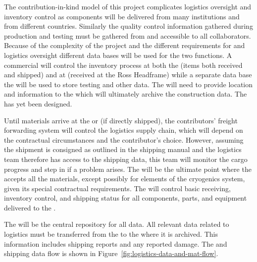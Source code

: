 The contribution-in-kind model of this project complicates logistics oversight and inventory control as components will be delivered from many institutions and from different countries. 
Similarly the quality control information gathered during production and testing must be gathered from and accessible to all collaborators. 
Because of the complexity of the project and the different requirements for  and logistics oversight different data bases will be used for the two functions. A commercial  will control the inventory process at both the  (items both received and shipped) and at  (received at the Ross Headframe) while a separate data base the  will be used to store testing and other  data. The  will need to provide location and   information to the  which will ultimately archive the construction data. The  has yet been designed.

Until materials arrive at the  or  (if directly shipped), the contributors' freight forwarding system will control the logistics supply chain, which will depend on the contractual circumstances and the contributor's choice. 
However, assuming the shipment is consigned as outlined in the 
shipping manual and the  logistics team therefore has access to the shipping data, this team will monitor the cargo progress and step in if a problem arises.
The  will be the ultimate point where the  accepts %
all the materials, except possibly for elements of the cryogenics system, given its special contractual requirements. The  will control basic receiving, inventory control, and shipping status for all components, parts, and equipment delivered to the .

The  will be the central repository for all  data. All relevant  data related to logistics must be transferred from the  to the  where it is archived. This information includes shipping reports and any reported damage. 
The  and shipping data flow is shown in Figure~\ref{fig:logistics-data-and-mat-flow}.

